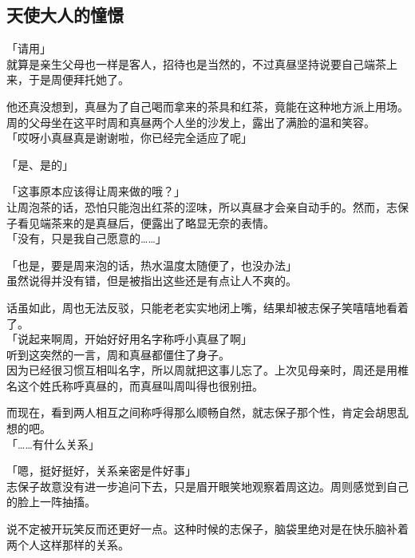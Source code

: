\subsection{天使大人的憧憬}

「请用」\\

就算是亲生父母也一样是客人，招待也是当然的，不过真昼坚持说要自己端茶上来，于是周便拜托她了。

他还真没想到，真昼为了自己喝而拿来的茶具和红茶，竟能在这种地方派上用场。\\

周的父母坐在这平时周和真昼两个人坐的沙发上，露出了满脸的温和笑容。\\

「哎呀小真昼真是谢谢啦，你已经完全适应了呢」

「是、是的」

「这事原本应该得让周来做的哦？」\\

让周泡茶的话，恐怕只能泡出红茶的涩味，所以真昼才会亲自动手的。然而，志保子看见端茶来的是真昼后，便露出了略显无奈的表情。\\

「没有，只是我自己愿意的……」

「也是，要是周来泡的话，热水温度太随便了，也没办法」\\

虽然说得并没有错，但是被指出这些还是有点让人不爽的。

话虽如此，周也无法反驳，只能老老实实地闭上嘴，结果却被志保子笑嘻嘻地看着了。\\

「说起来啊周，开始好好用名字称呼小真昼了啊」\\

听到这突然的一言，周和真昼都僵住了身子。\\

因为已经很习惯互相叫名字，所以周就把这事儿忘了。上次见母亲时，周还是用椎名这个姓氏称呼真昼的，而真昼叫周叫得也很别扭。

而现在，看到两人相互之间称呼得那么顺畅自然，就志保子那个性，肯定会胡思乱想的吧。\\

「……有什么关系」

「嗯，挺好挺好，关系亲密是件好事」\\

志保子故意没有进一步追问下去，只是眉开眼笑地观察着周这边。周则感觉到自己的脸上一阵抽搐。

说不定被开玩笑反而还更好一点。这种时候的志保子，脑袋里绝对是在快乐脑补着两个人这样那样的关系。\\

